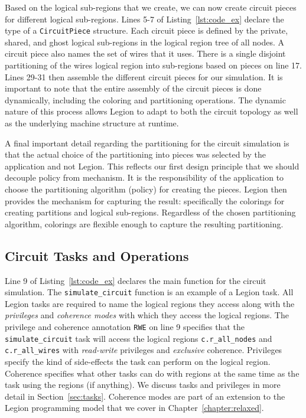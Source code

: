 Based on the logical sub-regions that we create, we
can now create circuit pieces for different
logical sub-regions. Lines 5-7 of 
Listing~\ref{lst:code_ex} declare the type of
a {\tt CircuitPiece} structure. Each circuit piece is
defined by the private, shared, and ghost logical
sub-regions in the logical region tree of all nodes.
A circuit piece also names the set of wires that it
uses. There is a single disjoint partitioning of the
wires logical region into sub-regions based on pieces
on line 17. Lines 29-31 then assemble the different
circuit pieces for our simulation. It is important
to note that the entire assembly of the circuit pieces
is done dynamically, including the coloring and 
partitioning operations. The dynamic nature of this
process allows Legion to adapt to both the circuit
topology as well as the underlying machine structure
at runtime.

A final important detail regarding the partitioning
for the circuit simulation is that the actual choice
of the partitioning into pieces was selected by
the application and not Legion. This reflects our
first design principle that we should decouple policy
from mechanism. It is the responsibility of the 
application to choose the partitioning algorithm (policy)
for creating the pieces.  Legion then provides the 
mechanism for capturing the result: specifically the
colorings for creating partitions and logical sub-regions.
Regardless of the chosen partitioning algorithm, 
colorings are flexible enough to capture the resulting
partitioning.

\subsection{Circuit Tasks and Operations}
\label{subsec:circuittasks}
Line 9 of Listing~\ref{lst:code_ex} declares 
the main function for the circuit simulation.
The {\tt simulate\_circuit} function is an example 
of a Legion task. All Legion tasks are required to
name the logical regions they access along with
the {\em privileges} and {\em coherence modes}
with which they access the logical regions. The
privilege and coherence annotation {\tt RWE} on
line 9 specifies that the {\tt simulate\_circuit}
task will access the logical regions {\tt c.r\_all\_nodes}
and {\tt c.r\_all\_wires} with {\em read-write} 
privileges and {\em exclusive} coherence. Privileges
specify the kind of side-effects the task can perform
on the logical region. Coherence specifies what
other tasks can do with regions at the same time
as the task using the regions (if anything). We
discuss tasks and privileges in more detail in 
Section~\ref{sec:tasks}. Coherence modes are part
of an extension to the Legion programming model
that we cover in Chapter~\ref{chapter:relaxed}.

